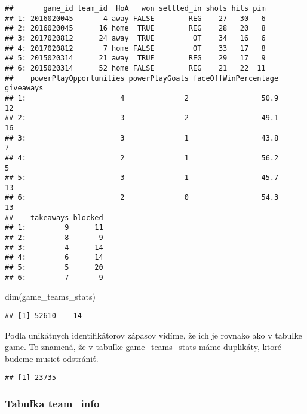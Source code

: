 \documentclass[
]{article}
\newenvironment{Shaded}{\begin{snugshade}}{\end{snugshade}}
\newcommand{\FunctionTok}[1]{\textcolor[rgb]{0.00,0.00,0.00}{#1}}
\newcommand{\NormalTok}[1]{#1}
\newcommand{\SpecialCharTok}[1]{\textcolor[rgb]{0.00,0.00,0.00}{#1}}
\begin{document}
\begin{verbatim}
##       game_id team_id  HoA   won settled_in shots hits pim
## 1: 2016020045       4 away FALSE        REG    27   30   6
## 2: 2016020045      16 home  TRUE        REG    28   20   8
## 3: 2017020812      24 away  TRUE         OT    34   16   6
## 4: 2017020812       7 home FALSE         OT    33   17   8
## 5: 2015020314      21 away  TRUE        REG    29   17   9
## 6: 2015020314      52 home FALSE        REG    21   22  11
##    powerPlayOpportunities powerPlayGoals faceOffWinPercentage giveaways
## 1:                      4              2                 50.9        12
## 2:                      3              2                 49.1        16
## 3:                      3              1                 43.8         7
## 4:                      2              1                 56.2         5
## 5:                      3              1                 45.7        13
## 6:                      2              0                 54.3        13
##    takeaways blocked
## 1:         9      11
## 2:         8       9
## 3:         4      14
## 4:         6      14
## 5:         5      20
## 6:         7       9
\end{verbatim}

\begin{Shaded}
\begin{Highlighting}[]
\FunctionTok{dim}\NormalTok{(game\_teams\_stats)}
\end{Highlighting}
\end{Shaded}

\begin{verbatim}
## [1] 52610    14
\end{verbatim}

Podľa unikátnych identifikátorov zápasov vidíme, že ich je rovnako ako v
tabuľke game. To znamená, že v tabuľke game\_teams\_stats máme
duplikáty, ktoré budeme musieť odstrániť.

\begin{Shaded}
\end{Shaded}

\begin{verbatim}
## [1] 23735
\end{verbatim}

\hypertarget{tabuux13eka-team_info}{%
\subsubsection{Tabuľka team\_info}\label{tabuux13eka-team_info}}
\end{document}
